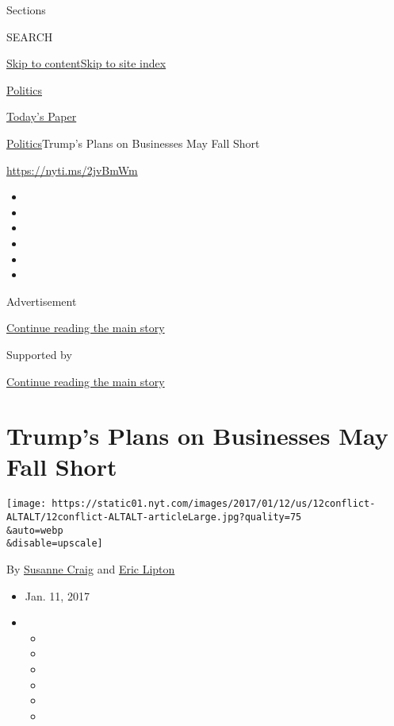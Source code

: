 Sections

SEARCH

\protect\hyperlink{site-content}{Skip to
content}\protect\hyperlink{site-index}{Skip to site index}

\href{https://www.nytimes.com/section/politics}{Politics}

\href{https://myaccount.nytimes.com/auth/login?response_type=cookie\&client_id=vi}{}

\href{https://www.nytimes.com/section/todayspaper}{Today's Paper}

\href{/section/politics}{Politics}\textbar{}Trump's Plans on Businesses
May Fall Short

\url{https://nyti.ms/2jvBmWm}

\begin{itemize}
\item
\item
\item
\item
\item
\item
\end{itemize}

Advertisement

\protect\hyperlink{after-top}{Continue reading the main story}

Supported by

\protect\hyperlink{after-sponsor}{Continue reading the main story}

\hypertarget{trumps-plans-on-businesses-may-fall-short}{%
\section{Trump's Plans on Businesses May Fall
Short}\label{trumps-plans-on-businesses-may-fall-short}}

\texttt{[image: https://static01.nyt.com/images/2017/01/12/us/12conflict-ALTALT/12conflict-ALTALT-articleLarge.jpg?quality=75\\\&auto=webp\\\&disable=upscale]}

By \href{http://www.nytimes.com/by/susanne-craig}{Susanne Craig} and
\href{http://www.nytimes.com/by/eric-lipton}{Eric Lipton}

\begin{itemize}
\item
  Jan. 11, 2017
\item
  \begin{itemize}
  \item
  \item
  \item
  \item
  \item
  \item
  \end{itemize}
\end{itemize}

